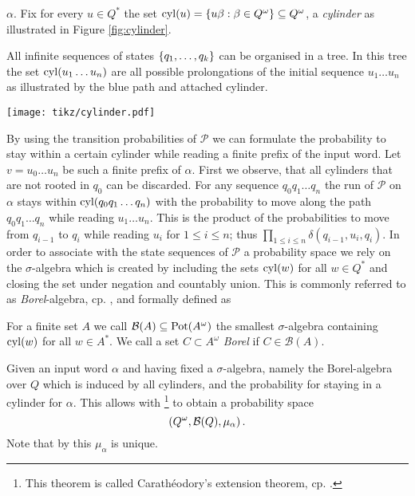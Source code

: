 $\alpha$. Fix for every $u\in Q^{*}$ the set 
$\operatorname{cyl}(u) = \left\{u\beta : \beta\in Q^{\omega}\right\}\subseteq Q^{\omega}$, a 
\emph{cylinder} as illustrated in Figure \ref{fig:cylinder}.
\begin{drawing}
  \caption{All infinite sequences of states $\left\{q_{1},\dots, q_{k}\right\}$ can be
  organised in a tree. In this tree the set $\operatorname{cyl}(u_{1}\dots u_{n})$ are all 
  possible prolongations of the initial sequence $u_{1}\dots u_{n}$ as 
  illustrated by the blue path and attached cylinder.}
  \label{fig:cylinder}
  \begin{center}
    \texttt{[image: tikz/cylinder.pdf]}
  \end{center}
\end{drawing}
By using the transition probabilities of $\mathcal{P}$ we can formulate the 
probability to stay within a certain cylinder while reading a finite prefix of 
the input word. Let $v = u_{0}\dots u_{n}$ be such a finite prefix of $\alpha$.
First we observe, that all cylinders that are not rooted in $q_{0}$ can be 
discarded. For any sequence $q_{0}q_{1}\dots q_{n}$ the run of $\mathcal{P}$
on $\alpha$ stays within $\operatorname{cyl}(q_{0}q_{1}\dots q_{n})$ with the probability to
move along the path $q_{0}q_{1}\dots q_{n}$ while reading $u_{1}\dots u_{n}$.
This is the product of the probabilities to move from $q_{i-1}$ to $q_{i}$
while reading $u_{i}$ for $1\leq i\leq n$; thus 
$\prod_{1\leq i\leq n}\delta(q_{i-1},u_{i},q_{i})$. In order to associate with
the state sequences of $\mathcal{P}$ a probability space we rely on the 
$\sigma$-algebra which is created by including the sets $\operatorname{cyl}(w)$ for all 
$w\in Q^{*}$ and closing the set under negation and countably union. This is
commonly referred to as \emph{Borel}-algebra, cp. \cite{}, and formally 
defined as
\begin{definition}
  For a finite set $A$ we call $\mathcal{B}(A)\subseteq\operatorname{Pot}(A^{\omega})$ the 
  smallest $\sigma$-algebra containing $\operatorname{cyl}(w)$ for all $w\in A^{*}$. We call
  a set $C\subset A^{\omega}$ \emph{Borel} if $C\in\mathcal{B}(A)$.
\end{definition}
Given an input word $\alpha$ and having fixed a $\sigma$-algebra, namely the
Borel-algebra over $Q$ which is induced by all cylinders, and the probability 
for staying in a cylinder for $\alpha$.
This allows with 
\cite[Theorem 5.6]{Bauer}\footnote{This theorem is called Carath\'{e}odory's
extension theorem, cp. \cite[Chapter 2.3.]{RandAutoInfTrees}.} to obtain a 
probability space
\begin{equation*}
  \left(Q^{\omega}, \mathcal{B}(Q), \mu_{\alpha}\right).
\end{equation*}
Note that by \cite[Theorem 5.4]{Bauer} this $\mu_{\alpha}$ is unique.

